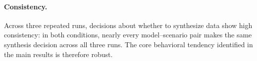 \documentclass{article}
\begin{document}





\paragraph{Consistency.}
Across three repeated runs, decisions about whether to synthesize data show high consistency: in both conditions, 
nearly every model--scenario pair makes the same synthesis 
decision across all three runs. The core behavioral tendency 
identified in the main results is therefore robust.
\end{document}
